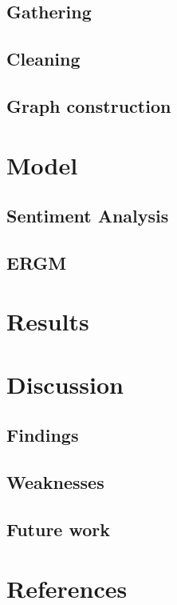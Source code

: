 \documentclass[
]{article}
\newlength{\cslhangindent}
\newlength{\cslentryspacingunit} %
\newenvironment{CSLReferences}[2] %
 {%
  \setlength{\parindent}{0pt}
  \ifodd #1
  \let\oldpar\par
  \def\par{\hangindent=\cslhangindent\oldpar}
  \fi
  \setlength{\parskip}{#2\cslentryspacingunit}
 }%
 {}
\begin{document}
\hypertarget{gathering}{%
\subsection{Gathering}\label{gathering}}

\hypertarget{cleaning}{%
\subsection{Cleaning}\label{cleaning}}

\hypertarget{graph-construction}{%
\subsection{Graph construction}\label{graph-construction}}

\hypertarget{model}{%
\section{Model}\label{model}}

\hypertarget{sentiment-analysis}{%
\subsection{Sentiment Analysis}\label{sentiment-analysis}}

\hypertarget{ergm}{%
\subsection{ERGM}\label{ergm}}

\hypertarget{results}{%
\section{Results}\label{results}}

\hypertarget{discussion}{%
\section{Discussion}\label{discussion}}

\hypertarget{findings}{%
\subsection{Findings}\label{findings}}

\hypertarget{weaknesses}{%
\subsection{Weaknesses}\label{weaknesses}}

\hypertarget{future-work}{%
\subsection{Future work}\label{future-work}}

\newpage

\hypertarget{references}{%
\section{References}\label{references}}

\hypertarget{refs}{}
\begin{CSLReferences}{0}{0}
\end{CSLReferences}
\end{document}
